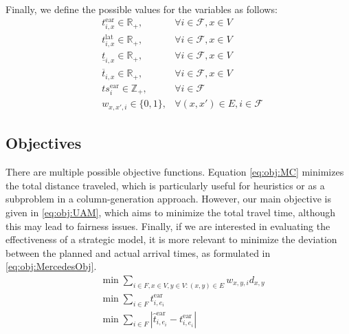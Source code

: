 \documentclass[../../thesis.tex]{subfiles}
\begin{document}
Finally, we define the possible values for the variables as follows:
\begin{align}
    &t^\text{ear}_{i,x} \in \mathbb{R}_{+}, &\forall i\in \mathcal{F}, x\in V \nonumber \\
    &t^\text{lat}_{i,x} \in \mathbb{R}_{+}, &\forall i\in \mathcal{F}, x\in V \nonumber \\    
    &\underline{t}_{i,x} \in \mathbb{R}_{+}, &\forall i\in \mathcal{F}, x\in V \nonumber \\
    &\overline{t}_{i,x} \in \mathbb{R}_{+}, &\forall i\in \mathcal{F}, x\in V \nonumber \\
    &ts^\text{ear}_i \in \mathbb{Z}_{+}, &\forall i\in \mathcal{F} \nonumber\\
    &w_{x,x',i} \in \{0,1\}, &\forall (x,x')\in E, i\in \mathcal{F} \nonumber
\end{align}

\subsection{Objectives}
There are multiple possible objective functions. Equation \eqref{eq:obj:MC} minimizes the total distance traveled, which is particularly useful for heuristics or as a subproblem in a column-generation approach.
However, our main objective is given in \eqref{eq:obj:UAM}, which aims to minimize the total travel time, although this may lead to fairness issues.
Finally, if we are interested in evaluating the effectiveness of a strategic model, it is more relevant to minimize the deviation between the planned and actual arrival times, as formulated in \eqref{eq:obj:MercedesObj}.
\begin{align}
    &\min \sum_{i \in F,x \in V,y \in V:(x,y)\in E} w_{x,y,i}d_{x,y} \label{eq:obj:MC}\\
    &\min \sum_{i\in F} t^\text{ear}_{i,e_{i}}\label{eq:obj:UAM}\\
    &\min \sum_{i\in F} |\hat t^\text{ear}_{i,e_{i}} - t^\text{ear}_{i,e_{i}}|\label{eq:obj:MercedesObj}
\end{align}
\end{document}
